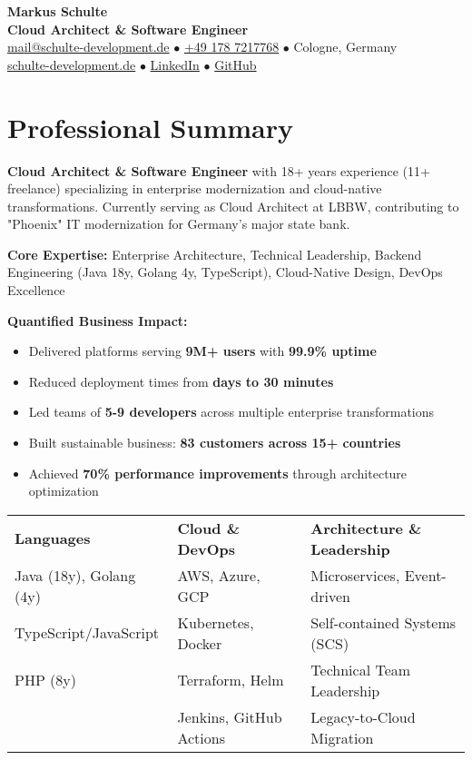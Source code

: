 \documentclass[10pt,a4paper]{article}
\begin{document}
\begin{center}
\huge\textbf{\color{darkblue}Markus Schulte}\\[2mm]
\Large\textbf{Cloud Architect \& Software Engineer}\\[3mm]
\normalsize
\href{mailto:mail@schulte-development.de}{mail@schulte-development.de} $\bullet$ 
\href{tel:+4917872177768}{+49 178 7217768} $\bullet$ 
Cologne, Germany\\
\href{https://schulte-development.de}{schulte-development.de} $\bullet$ 
\href{https://linkedin.com/in/markus-schulte}{LinkedIn} $\bullet$ 
\href{https://github.com/SchulteDev}{GitHub}
\end{center}

\vspace{3mm}

\section{Professional Summary}

\textbf{Cloud Architect \& Software Engineer} with 18+ years experience (11+ freelance) specializing in enterprise modernization and cloud-native transformations. Currently serving as Cloud Architect at LBBW, contributing to "Phoenix" IT modernization for Germany's major state bank.

\textbf{Core Expertise:} Enterprise Architecture, Technical Leadership, Backend Engineering (Java 18y, Golang 4y, TypeScript), Cloud-Native Design, DevOps Excellence

\textbf{Quantified Business Impact:}
\begin{itemize}
\item Delivered platforms serving \textbf{9M+ users} with \textbf{99.9\% uptime}
\item Reduced deployment times from \textbf{days to 30 minutes}
\item Led teams of \textbf{5-9 developers} across multiple enterprise transformations
\item Built sustainable business: \textbf{83 customers across 15+ countries}
\item Achieved \textbf{70\% performance improvements} through architecture optimization
\end{itemize}

\vspace{2mm}
\begin{tabularx}{\textwidth}{>{\raggedright\arraybackslash}X >{\raggedright\arraybackslash}X >{\raggedright\arraybackslash}X}
\textbf{Languages} & \textbf{Cloud \& DevOps} & \textbf{Architecture \& Leadership} \\
Java (18y), Golang (4y) & AWS, Azure, GCP & Microservices, Event-driven \\
TypeScript/JavaScript & Kubernetes, Docker & Self-contained Systems (SCS) \\
PHP (8y) & Terraform, Helm & Technical Team Leadership \\
& Jenkins, GitHub Actions & Legacy-to-Cloud Migration \\
\end{tabularx}
\end{document}
